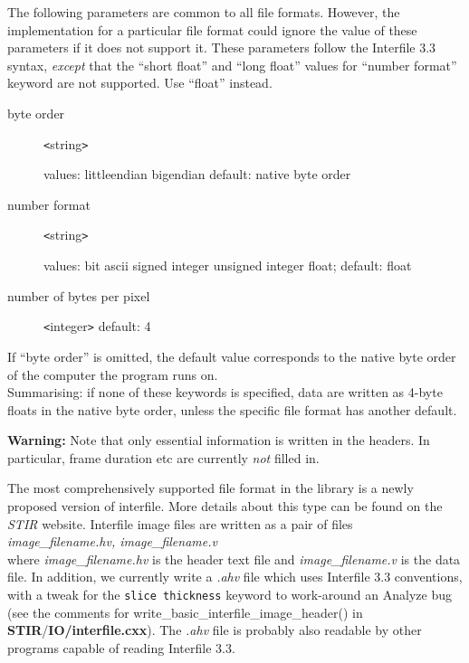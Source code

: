 \documentclass{article}
\begin{document}
{ 
}
\label{ref:outputcommonparameters}
The following parameters are common to all file formats. However, 
the implementation for a particular file format could ignore 
the value of these parameters if it does not support it. These 
parameters follow the Interfile 3.3 syntax, \textit{except} that the 
``short float'' and ``long float'' values for ``number format'' 
keyword are not supported. Use ``float'' instead.


\begin{description}
\item[byte order] \texttt{<}string\texttt{>}\linebreak
\raggedright
 values: littleendian {\textbar} bigendian\linebreak
 default: native byte order

\item[number format] \texttt{<}string\texttt{>}\linebreak
\raggedright
 values: bit {\textbar} ascii 
{\textbar} signed integer {\textbar} 
 unsigned integer {\textbar} float;\linebreak
default: float
\item[number of bytes per pixel] \texttt{<}integer\texttt{>}\linebreak
 default: 4
\end{description}


If ``byte order'' is omitted, the default value corresponds to 
the native byte order of the computer the program runs on.\\
Summarising: if none of these keywords is specified, data are 
written as 4-byte floats in the native byte order, unless the 
specific file format has another default.



\textbf{Warning:} Note that only essential information is written 
in the headers. In particular, frame duration etc are currently \textit{not} 
filled in.

{ 
}
\label{sec:outputinterfile}
The most comprehensively supported file format in the library 
is a newly proposed version of interfile. More details about 
this type can be found on the \textit{STIR} website.
Interfile image files are written as a pair of files
\textit{image\_filename.hv,
image\_filename.v}\\
where \textit{image\_filename.hv} is the header text file and \textit{image\_filename.v} 
is the data file. In addition, we currently write a \textit{.ahv} 
file which uses Interfile 3.3 conventions, with a tweak for the 
\texttt{slice thickness} keyword to work-around an Analyze\texttrademark{} 
bug (see the comments for write\_basic\_interfile\_image\_header() 
in \textbf{STIR}/\textbf{IO/interfile.cxx}). The \textit{.ahv} file is probably 
also readable by other programs capable of reading Interfile 
3.3.
\end{document}
